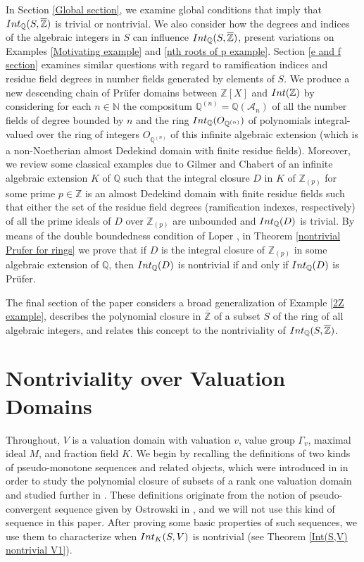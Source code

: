 \documentclass{article}
\theoremstyle{definition}\newtheorem{Def}[equation]{Definition}
\theoremstyle{definition}\newtheorem{Ques}[equation]{Question}
\theoremstyle{definition}\newtheorem{Conj}[equation]{Conjecture}
\theoremstyle{definition}\newtheorem{Not}[equation]{Notation}
\newcommand{\N}{\mathbb{N}}
\newcommand{\Q}{\mathbb{Q}}
\newcommand{\oQ}{\overline{\Q}}
\newcommand{\oZ}{\overline{\Z}}
\newcommand{\Z}{\mathbb{Z}}
\newcommand{\Int}{\textnormal{Int}}
\newcommand{\IntQ}{\Int_{\Q}}
\newcommand{\An}{\mathcal{A}_n}
\numberwithin{equation}{section}
\begin{document}
In Section \ref{Global section}, we examine global conditions that imply that $\IntQ(S,\oZ)$ is trivial or nontrivial. 
We also consider how the degrees and indices of the algebraic integers in $S$ can influence $\IntQ(S,\oZ)$, present variations on Examples \ref{Motivating example} and \ref{nth roots of p example}. Section \ref{e and f section} examines similar questions with regard to ramification indices and residue field degrees in number fields generated by elements of $S$. We produce a new descending chain of Pr\"ufer domains between $\Z[X]$ and $\Int(\Z)$ by considering for each $n\in\N$ the compositum $\Q^{(n)}=\Q(\An)$ of all the number fields of degree bounded by $n$ and the ring $\IntQ(O_{\Q^{(n)}})$ of polynomials integral-valued over the ring of integers $O_{\Q^{(n)}}$ of this infinite algebraic extension (which is a non-Noetherian almost Dedekind domain with finite residue fields). Moreover, we review some classical examples due to Gilmer \cite[Example 14]{GilmEx}  and Chabert \cite[Example 6.2]{ChabEx} of an infinite algebraic extension $K$ of $\Q$ such that the integral closure $D$ in $K$ of $\Z_{(p)}$ for some prime $p\in\Z$ is an almost Dedekind domain with finite residue fields such that either the set of the residue field degrees (ramification indexes, respectively) of all the prime ideals of $D$ over $\Z_{(p)}$ are  unbounded and $\IntQ(D)$ is trivial. By means of the double boundedness condition of Loper \cite{LopIntD}, in Theorem \ref{nontrivial Prufer for rings} we prove that if $D$ is the integral closure of $\Z_{(p)}$ in some algebraic extension of $\Q$, then $\IntQ(D)$ is nontrivial if and only if $\IntQ(D)$ is Pr\"ufer.

The final section of the paper considers a broad generalization of Example \ref{2Z example}, describes the polynomial closure in $\oZ$ of a subset $S$ of the ring of all algebraic integers, and relates this concept to the nontriviality of $\IntQ(S,\oZ)$.


\section{Nontriviality over Valuation Domains}\label{Val dom section}
Throughout, $V$ is a valuation domain with valuation $v$, value group $\Gamma_v$, maximal ideal $M$, and fraction field $K$. We begin by recalling the  definitions of two kinds of pseudo-monotone sequences and related objects, which were introduced in \cite{ChabPolCloVal} in order to study the polynomial closure of subsets of a rank one valuation domain and studied further in \cite{PerPrufer, PS2}. These definitions originate from the notion of pseudo-convergent sequence given by Ostrowski in \cite{Ostrowski}, and we will not use this kind of sequence in this paper. After proving some basic properties of such sequences, we use them to characterize when $\Int_K(S,V)$ is nontrivial (see Theorem \ref{Int(S,V) nontrivial V1}).
\end{document}
